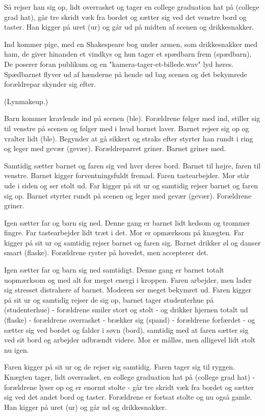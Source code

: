 \documentclass[a4paper,11pt]{article}
\begin{document}
\begin{sketch}
{Så rejser han sig op, lidt overrasket og tager en college graduation hat på (college grad hat), går tre skridt væk fra bordet og sætter sig ved det venstre bord og taster. Han kigger på uret (ur) og går ud på midten af scenen og drikkesnakker.

Ind kommer pige, med en Shakespeare bog under armen, som drikkesnakker med ham, de giver hinanden et vindkys og hun tager et spædbarn frem (spædbarn). De poserer foran publikum og en "kamera-tager-et-billede.wav" lyd høres. Spædbarnet flyver ud af hænderne på hende ud bag scenen og det bekymrede forældrepar skynder sig efter.


(Lynmakeup.)


Barn kommer kravlende ind på scenen (ble). Forældrene følger med ind, stiller sig til venstre på scenen og følger med i hvad barnet laver. Barnet rejser sig op og vralter lidt (ble). Begynder at gå sikkert og straks efter styrter han rundt i ring og leger med gevær (gevær). Forældreparret griner. Barnet griner med.

Samtidig sætter barnet og faren sig ved hver deres bord. Barnet til højre, faren til venstre. Barnet kigger forventningsfuldt fremad. Faren tastearbejder. Mor står ude i siden og ser stolt ud. Far kigger på sit ur og samtidig rejser barnet og faren sig op. Barnet styrter rundt på scenen og leger med gevær (gevær). Forældrene griner.

Igen sætter far og barn sig ned. Denne gang er barnet lidt kedsom og trommer fingre. Far tastearbejder lidt træt i det. Mor er opmærksom på knægten. Far kigger på sit ur og samtidig rejser barnet og faren sig. Barnet drikker øl og danser smart (flaske). Forældrene ryster på hovedet, men accepterer det.

Igen sætter far og barn sig ned samtidigt. Denne gang er barnet totalt uopmærksom og med alt for meget energi i kroppen. Faren arbejder, men lader sig stresset distrahere af barnet. Moderen ser meget bekymret ud. Faren kigger på sit ur og samtidig rejser de sig op, barnet tager studenterhue på (studenterhue) - forældrene smiler stort og stolt - og drikker hjernen totalt ud (flaske) - forældrene overrasket - brækker sig (spand) - forældrene forfærdet - og sætter sig ved bordet og falder i søvn (bord), samtidig med at faren sætter sig ved sit bord og arbejder udbrændt videre. Mor er målløs, men alligevel lidt stolt nu igen.

Faren kigger på sit ur og de rejser sig samtidig. Faren tager sig til ryggen. Knægten tager, lidt overrasket, en college graduation hat på (college grad hat) - forældrene lyser op og er enormt stolte - går tre skridt væk fra bordet og sætter sig ved det andet bord og taster. Forældrene er fortsat stolte og nu også gamle. Han kigger på uret (ur) og går ud og drikkesnakker.

}
\end{sketch}
\end{document}
